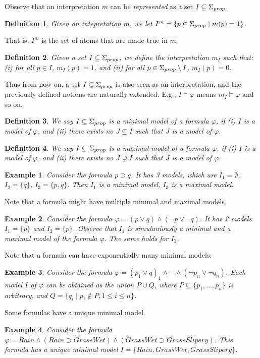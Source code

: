\documentclass[12pt]{extarticle}
\newtheorem{definition}{Definition}
\newtheorem{example}{Example}
\begin{document}
Observe that an interpretation $m$ can be \emph{represented} as a set
$I\subseteq \Sigma_{prop}$.
\begin{definition}
Given an intepretation $m$, we let
$I^{m}=\{p\in\Sigma_{prop} \mid m(p)=1\}$. 
\end{definition}
That is, $I^{m}$ is the set of
atoms that are made true in $m$.
\begin{definition}
Given a set $I\subseteq \Sigma_{prop}$,
we define the interpretation $m_I$ such that: (i) for all $p\in I$,
$m_{I}(p)=1$, and (ii) for all $p\in \Sigma_{prop} \setminus I$,
$m_{I}(p)=0$.
\end{definition}
Thus from now on, a set $I\subseteq \Sigma_{prop}$ is also
seen as an interpretation, and the previously defined notions are
naturally extended. E.g., $I\models \varphi$ means
$m_{I}\models \varphi$ and so on.

\begin{definition}
  We say $I\subseteq \Sigma_{prop}$ is a \emph{minimal model} of a formula
  $\varphi$, if (i) $I$ is a model of $\varphi$, and (ii) there exists
  no $J\subsetneq I$ such that $J$ is a model of $\varphi$.
\end{definition}
\begin{definition}
We say $I\subseteq \Sigma_{prop}$ is a \emph{maximal model} of a formula
  $\varphi$, if (i) $I$ is a model of $\varphi$, and (ii) there exists
  no $J\supsetneq I$ such that $J$ is a model of $\varphi$.
\end{definition}

\begin{example}
  Consider the formula $p\supset q$. It has 3 models, which are $I_1=\emptyset$,
  $I_2=\{q\}$, $I_3=\{p,q\}$. Then $I_1$ is a minimal model, $I_3$ is a maximal model. 
\end{example}
Note that a formula might have multiple minimal and maximal models.
\begin{example}
  Consider the formula $\varphi = (p \lor q) \land (\neg p\lor \neg q)$. It has 2 models $I_1=\{p\}$ and $I_2=\{p\}$. Observe that $I_1$ is simulaniously a minimal and a maximal model of the formula $\varphi$.
  The same holds for $I_2$.
\end{example}
Note that a formula can have exponentially many minimal models:
\begin{example}
  Consider the formula
  $\varphi = (p_1 \lor q)_1 \land \cdots \land (\neg p_n\lor \neg
  q_n)$. Each model $I$ of $\varphi$ can be obtained as the union $P\cup Q$, where
  $P\subseteq\{ p_1,\ldots,p_n\}$ is arbitrary, and $Q = \{q_i\mid p_i\not\in P, 1\leq i \leq n\}$.
\end{example}
Some formulas have a unique minimal model.
\begin{example}
  Consider the formula $\varphi= \mathit{Rain} \land (\mathit{Rain} \supset \mathit{GrassWet})\land (\mathit{GrassWet} \supset \mathit{GrassSlipery}) $.
 This formula has a unique minimal model $I = \{ \mathit{Rain}, \mathit{GrassWet},\mathit{GrassSlipery}\}$. 
\end{example}
\end{document}
